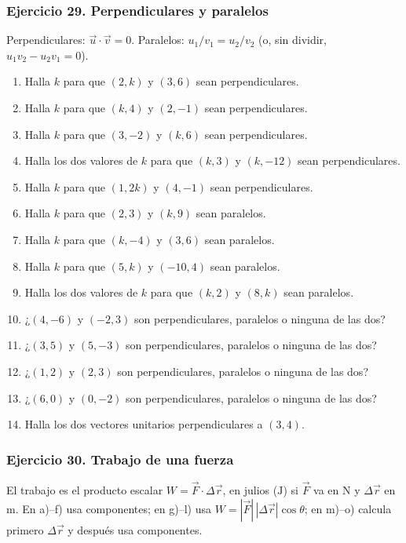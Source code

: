 \subsubsection*{Ejercicio 29. Perpendiculares y paralelos}

Perpendiculares: $\vec{u}\cdot\vec{v}=0$.
Paralelos: $u_1/v_1=u_2/v_2$ (o, sin dividir, $u_1v_2-u_2v_1=0$).

\begin{enumerate}
    \item[a)] Halla $k$ para que $(2,k)$ y $(3,6)$ sean perpendiculares.
    \item[b)] Halla $k$ para que $(k,4)$ y $(2,-1)$ sean perpendiculares.
    \item[c)] Halla $k$ para que $(3,-2)$ y $(k,6)$ sean perpendiculares.
    \item[d)] Halla los dos valores de $k$ para que $(k,3)$ y $(k,-12)$ sean perpendiculares.
    \item[e)] Halla $k$ para que $(1,2k)$ y $(4,-1)$ sean perpendiculares.
    \item[f)] Halla $k$ para que $(2,3)$ y $(k,9)$ sean paralelos.
    \item[g)] Halla $k$ para que $(k,-4)$ y $(3,6)$ sean paralelos.
    \item[h)] Halla $k$ para que $(5,k)$ y $(-10,4)$ sean paralelos.
    \item[i)] Halla los dos valores de $k$ para que $(k,2)$ y $(8,k)$ sean paralelos.
    \item[j)] ¿$(4,-6)$ y $(-2,3)$ son perpendiculares, paralelos o ninguna de las dos?
    \item[k)] ¿$(3,5)$ y $(5,-3)$ son perpendiculares, paralelos o ninguna de las dos?
    \item[l)] ¿$(1,2)$ y $(2,3)$ son perpendiculares, paralelos o ninguna de las dos?
    \item[m)] ¿$(6,0)$ y $(0,-2)$ son perpendiculares, paralelos o ninguna de las dos?
    \item[n)] Halla los dos vectores unitarios perpendiculares a $(3,4)$.
\end{enumerate}

\subsubsection*{Ejercicio 30. Trabajo de una fuerza}

El trabajo es el producto escalar $W=\vec{F}\cdot\Delta\vec{r}$, en julios ($\mathrm{J}$) si $\vec{F}$ va en $\mathrm{N}$ y $\Delta\vec{r}$ en $\mathrm{m}$.
En a)--f) usa componentes; en g)--l) usa
$W=|\vec{F}|\,|\Delta\vec{r}|\cos\theta$;
en m)--o) calcula primero $\Delta\vec{r}$ y después usa componentes.

